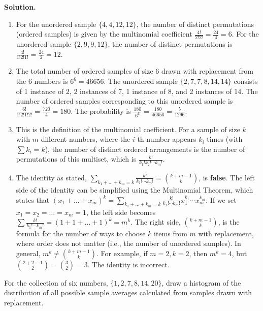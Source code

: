 \noindent\textbf{Solution.}
\begin{enumerate}[label=(\alph*)]
    \item For the unordered sample $\{4,4,12,12\}$, the number of distinct permutations (ordered samples) is given by the multinomial coefficient $\frac{4!}{2!2!} = \frac{24}{4} = 6$.
    \vspace{1ex} %
    For the unordered sample $\{2,9,9,12\}$, the number of distinct permutations is $\frac{4!}{1!2!1!} = \frac{24}{2} = 12$.
    \item The total number of ordered samples of size 6 drawn with replacement from the 6 numbers is $6^6 = 46656$. The unordered sample $\{2,7,7,8,14,14\}$ consists of 1 instance of 2, 2 instances of 7, 1 instance of 8, and 2 instances of 14. The number of ordered samples corresponding to this unordered sample is $\frac{6!}{1!2!1!2!} = \frac{720}{4} = 180$.
    \vspace{1ex} %
    The probability is $\frac{180}{6^6} = \frac{180}{46656} = \frac{5}{1296}$.
    \item This is the definition of the multinomial coefficient. For a sample of size $k$ with $m$ different numbers, where the $i$-th number appears $k_i$ times (with $\sum k_i=k$), the number of distinct ordered arrangements is the number of permutations of this multiset, which is $\frac{k!}{k_1!k_2!\cdots k_m!}$.
    \item The identity as stated, $\sum_{k_1+\dots+k_m=k}\frac{k!}{k_1!\cdots k_m!} = \binom{k+m-1}{k}$, is \textbf{false}.
    \vspace{1ex} %
    The left side of the identity can be simplified using the Multinomial Theorem, which states that $(x_1 + \dots + x_m)^k = \sum_{k_1+\dots+k_m=k}\frac{k!}{k_1!\cdots k_m!} x_1^{k_1}\cdots x_m^{k_m}$.
    \vspace{1ex} %
    If we set $x_1 = x_2 = \dots = x_m = 1$, the left side becomes $\sum \frac{k!}{k_1!\cdots k_m!} = (1+1+\dots+1)^k = m^k$.
    \vspace{1ex} %
    The right side, $\binom{k+m-1}{k}$, is the formula for the number of ways to choose $k$ items from $m$ with replacement, where order does not matter (i.e., the number of unordered samples).
    \vspace{1ex} %
    In general, $m^k \neq \binom{k+m-1}{k}$. For example, if $m=2, k=2$, then $m^k = 4$, but $\binom{2+2-1}{2} = \binom{3}{2} = 3$. The identity is incorrect.
\end{enumerate}


\begin{problembox}
For the collection of six numbers, $\{1,2,7,8,14,20\}$, draw a histogram of the distribution of all possible sample averages calculated from samples drawn with replacement.
\end{problembox}

